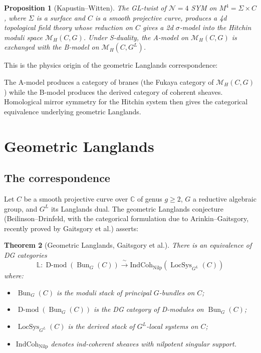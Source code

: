 \documentclass[11pt]{article}
\newtheorem{theorem}{Theorem}[section]
\newtheorem{proposition}[theorem]{Proposition}
\theoremstyle{definition}
\theoremstyle{remark}
\DeclareMathOperator{\Bun}{Bun}
\DeclareMathOperator{\LocSys}{LocSys}
\DeclareMathOperator{\Dmod}{D\text{-}mod}
\begin{document}
\begin{proposition}[Kapustin--Witten]
\label{prop:kw-4dtft}
The GL-twist of $\mathcal{N}=4$ SYM on $M^4 = \Sigma \times C$, where
$\Sigma$ is a surface and $C$ is a smooth projective curve, produces a
4d topological field theory whose reduction on $C$ gives a 2d
$\sigma$-model into the Hitchin moduli space $\mathcal{M}_H(C,G)$. Under
S-duality, the A-model on $\mathcal{M}_H(C,G)$ is exchanged with the
B-model on $\mathcal{M}_H(C,G^L)$.
\end{proposition}

This is the physics origin of the geometric Langlands correspondence:
\begin{center}
\end{center}

The A-model produces a category of branes (the Fukaya category of
$\mathcal{M}_H(C,G)$) while the B-model produces the derived category of
coherent sheaves. Homological mirror symmetry for the Hitchin system then
gives the categorical equivalence underlying geometric Langlands.


\section{Geometric Langlands}
\label{sec:geom-langlands}

\subsection{The correspondence}

Let $C$ be a smooth projective curve over $\mathbb{C}$ of genus $g \geq 2$,
$G$ a reductive algebraic group, and $G^L$ its Langlands dual. The geometric
Langlands conjecture (Beilinson--Drinfeld, with the categorical formulation
due to Arinkin--Gaitsgory, recently proved by Gaitsgory et al.) asserts:

\begin{theorem}[Geometric Langlands, Gaitsgory et al.]
\label{thm:geom-langlands}
There is an equivalence of DG categories
\[
 \mathbb{L} \colon \Dmod(\Bun_G(C)) \xrightarrow{\;\sim\;}
 \mathrm{IndCoh}_{\mathrm{Nilp}}(\LocSys_{G^L}(C))
\]
where:
\begin{itemize}
 \item $\Bun_G(C)$ is the moduli stack of principal $G$-bundles on $C$;
 \item $\Dmod(\Bun_G(C))$ is the DG category of D-modules on $\Bun_G(C)$;
 \item $\LocSys_{G^L}(C)$ is the derived stack of $G^L$-local systems on $C$;
 \item $\mathrm{IndCoh}_{\mathrm{Nilp}}$ denotes ind-coherent sheaves with
 nilpotent singular support.
\end{itemize}
\end{theorem}
\end{document}

